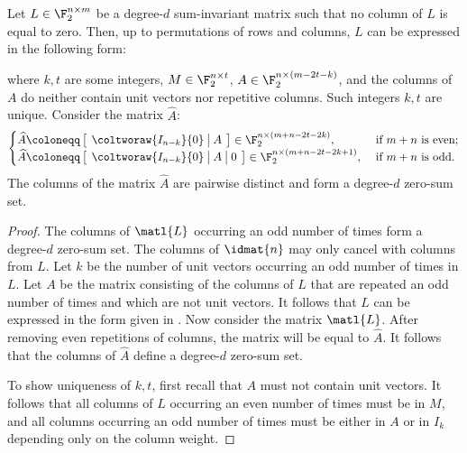 \begin{proposition}
Let $L \in \F_2^{n \times m}$ be a degree-$d$ sum-invariant matrix such that no column of $L$ is equal to zero. Then, up to permutations of rows and columns, $L$ can be expressed in the following form:

where $k,t$ are some integers, $M \in \F_2^{n \times t}$, $A \in \F_2^{n \times (m - 2t - k)}$, and the columns of $A$ do neither contain unit vectors nor repetitive columns. Such integers $k,t$ are unique. 
Consider the matrix $\widehat{A}$:
\begin{equation}
    \begin{cases}
    \arraycolsep=4pt\def\arraystretch{1}
    \widehat{A} \coloneqq\left[
    \begin{array}{c|c} \coltworaw{I_{n-k}}{0} & A\end{array}
    \right] \in \F_2^{n\times(m+n-2t-2k)},
    & \text{~if~} m+n \text{~is even}; \\
    \arraycolsep=4pt\def\arraystretch{1}
    \widehat{A} \coloneqq \left[
    \begin{array}{c|c|c} \coltworaw{I_{n-k}}{0} & A & 0\end{array}\right
    ] \in \F_2^{n\times(m+n-2t-2k+1)},
    & \text{~if~} m+n \text{~is odd}.
    \end{cases}
\end{equation}
The columns of the matrix $\widehat{A}$ are pairwise distinct and form a degree-$d$ zero-sum set.
\end{proposition}
\begin{proof}
The columns of $\matl{L}$ occurring an odd number of times form a degree-$d$ zero-sum set. The columns of $\idmat{n}$ may only cancel with columns from $L$. Let $k$ be the number of unit vectors occurring an odd number of times in $L$. Let $A$ be the matrix consisting of the columns of $L$ that are repeated an odd number of times and which are not unit vectors. It follows that $L$ can be expressed in the form given in . Now consider the matrix $\matl{L}$. After removing even repetitions of columns, the matrix will be equal to $\widehat{A}$. It follows that the columns of $\widehat{A}$ define a degree-$d$ zero-sum set. 

To show uniqueness of $k,t$, first recall that $A$ must not contain unit vectors. It follows that all columns of $L$ occurring an even number of times must be in $M$, and all columns occurring an odd number of times must be either in $A$ or in $I_k$ depending only on the column weight.

\end{proof}


